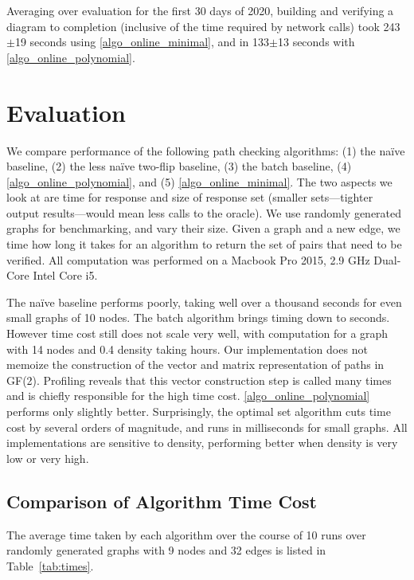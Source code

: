 \documentclass[sigplan,review,anonymous]{acmart}
\begin{document}
{Averaging over evaluation for the first 30 days of 2020, building and verifying a diagram to completion (inclusive of the time required by network calls) took 243$\pm$19 seconds using \ref{algo_online_minimal}, and in 133$\pm$13 seconds with \ref{algo_online_polynomial}.

\section{Evaluation}
\label{sec:evaluation}
We compare performance of the following path checking algorithms:
(1) the na\"{i}ve baseline,
(2) the less na\"{i}ve two-flip baseline,
(3) the batch baseline,
(4) \ref{algo_online_polynomial}, and
(5) \ref{algo_online_minimal}.
The two aspects we look at are time for response and size of response set (smaller sets---tighter output results---would mean less calls to the oracle).
We use randomly generated graphs for benchmarking, and vary their size.
Given a graph and a new edge, we time how long it takes for an algorithm to return  the set of pairs that need to be verified.
All computation was performed on a Macbook Pro 2015, 2.9 GHz Dual-Core Intel Core i5.

The na\"{i}ve baseline performs poorly, taking well over a thousand seconds for even small graphs of 10 nodes.
The batch algorithm brings timing down to seconds.
However time cost still does not scale very well, with computation for a graph with 14 nodes and 0.4 density taking hours.
Our implementation does not memoize the construction of the vector and matrix representation of paths in GF(2).
Profiling reveals that this vector construction step is called many times and is chiefly responsible for the high time cost.
\ref{algo_online_polynomial} performs only slightly better.
Surprisingly, the optimal set algorithm cuts time cost by several orders of magnitude, and runs in milliseconds for small graphs.
All implementations are sensitive to density, performing better when density is very low or very high.

\subsection{Comparison of Algorithm Time Cost}
The average time taken by each algorithm over the course of 10 runs over randomly generated graphs with 9 nodes and 32 edges is listed in Table~\ref{tab:times}.

}
\end{document}
